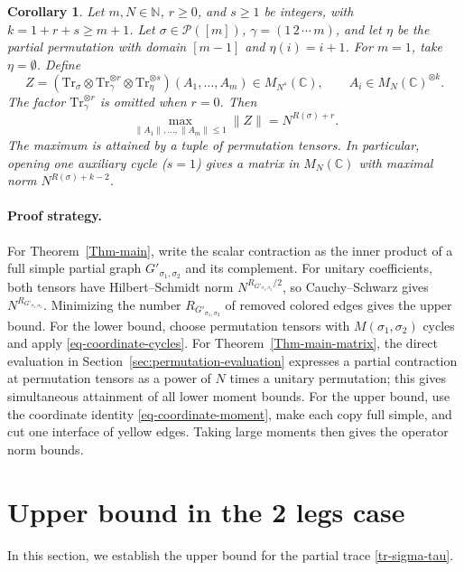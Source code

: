 \documentclass[12pt]{article}
\numberwithin{equation}{section}
\theoremstyle{plain}
\newtheorem{corollary}[theorem]{Corollary}
\def\bN{\mathbb N}
\def\bC{\mathbb C}
\def\cP{\mathcal P}
\def\Tr{\mathrm {Tr}}
\begin{document}
\begin{corollary}\label{Coro-open-chain-equality}
Let $m,N\in\bN$, $r\ge0$, and $s\ge1$ be integers, with $k=1+r+s\ge m+1$. Let $\sigma\in\cP([m])$, $\gamma=(1\,2\,\cdots\,m)$, and let $\eta$ be the partial permutation with domain $[m-1]$ and $\eta(i)=i+1$. For $m=1$, take $\eta=\emptyset$. Define
\[
Z=(\Tr_\sigma\otimes\Tr_\gamma^{\otimes r}\otimes\Tr_\eta^{\otimes s})(A_1,\ldots,A_m)
\in M_{N^s}(\bC),\qquad A_i\in M_N(\bC)^{\otimes k}.
\]
The factor $\Tr_\gamma^{\otimes r}$ is omitted when $r=0$. Then
\begin{equation}
\max_{\|A_1\|,\ldots,\|A_m\|\le1}\|Z\|=N^{R(\sigma)+r}.
\end{equation}
The maximum is attained by a tuple of permutation tensors. In particular, opening one auxiliary cycle ($s=1$) gives a matrix in $M_N(\bC)$ with maximal norm $N^{R(\sigma)+k-2}$.
\end{corollary}

\paragraph{Proof strategy.}
For Theorem~\ref{Thm-main}, write the scalar contraction as the inner product of a full simple partial graph $G'_{\sigma_1,\sigma_2}$ and its complement. For unitary coefficients, both tensors have Hilbert--Schmidt norm $N^{R_{G'_{\sigma_1,\sigma_2}}/2}$, so Cauchy--Schwarz gives $N^{R_{G'_{\sigma_1,\sigma_2}}}$. Minimizing the number $R_{G'_{\sigma_1,\sigma_2}}$ of removed colored edges gives the upper bound. For the lower bound, choose permutation tensors with $M(\sigma_1,\sigma_2)$ cycles and apply \eqref{eq-coordinate-cycles}.
For Theorem~\ref{Thm-main-matrix}, the direct evaluation in Section~\ref{sec:permutation-evaluation} expresses a partial contraction at permutation tensors as a power of $N$ times a unitary permutation; this gives simultaneous attainment of all lower moment bounds. For the upper bound, use the coordinate identity \eqref{eq-coordinate-moment}, make each copy full simple, and cut one interface of yellow edges. Taking large moments then gives the operator norm bounds.

\section{Upper bound in the 2 legs case} \label{sec:upper}

In this section, we establish the upper bound for the partial trace \eqref{tr-sigma-tau}.
\end{document}
